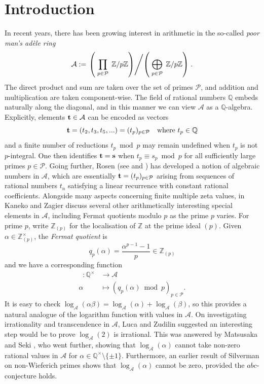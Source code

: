 \documentclass[12pt,reqno]{amsart}
\theoremstyle{remark}
\newcommand{\cA}{\mathcal A}
\newcommand{\cP}{\mathcal P}
\DeclareMathOperator{\logA}{\log_{\mathcal{A}}}
\begin{document}
\section{Introduction}
In recent years, there has been growing interest in arithmetic in the so-called {\it poor man's ad\`{e}le ring}
\[\cA:=\left.\left(\;\prod_{p\in\cP}\;\mathbb{Z}/p\mathbb{Z}\right) \middle/ \left(\;\bigoplus_{p\in\cP}\;\mathbb{Z}/p\mathbb{Z}\right)\right.. \]
The direct product and sum are taken over the set of primes $\cP$, and addition and multiplication are taken component-wise.
The field of rational numbers $\mathbb{Q}$ embeds naturally along the diagonal, and in this manner we can view $\mathcal{A}$ as a $\mathbb{Q}$-algebra. 
Explicitly, elements ${\bf t}\in\cA$ can be encoded as vectors
\[{\bf t}=(t_2, t_3, t_5,...) = (t_p)_{p\in\mathcal{P}}\quad\text{where $t_p\in\mathbb{Q}$}\]
and a finite number of reductions $t_p\bmod p$ may remain undefined when $t_p$ is not $p$-integral. 
One then identifies ${\bf t}={\bf s}$ when $t_p\equiv s_p\bmod p$ for all sufficiently large primes $p\in\cP$. Going further, Rosen (see \cite{Ro20} and \cite{RTTY24}) has developed a notion of algebraic numbers in $\mathcal{A}$, which are essentially ${\bf t}=(t_p)_{p\in\mathcal{P}}$ arising from sequences of rational numbers $t_n$ satisfying a linear recurrence with constant rational coefficients. 
Alongside many aspects concerning finite multiple zeta values, in \cite{KZ} Kaneko and Zagier discuss several other arithmetically interesting special elements in $\cA$, including Fermat quotients modulo $p$ as the prime $p$ varies. 
For prime $p$, write $\mathbb{Z}_{(p)}$ for the localisation of $\mathbb{Z}$ at the prime ideal $(p)$. 
Given $\alpha\in\mathbb{Z}_{(p)}^\times$, the {\it Fermat quotient} is
\[q_p(\alpha)=\frac{\alpha^{p-1}-1}{p}\in\mathbb{Z}_{(p)}\]
and we have a corresponding function
\begin{align*}
\logA:\mathbb{Q}^\times & \longrightarrow\cA \\
\alpha& \longmapsto \left(q_p(\alpha)\bmod p\right)_{p\in\cP}.
\end{align*}
It is easy to check $\log_\cA(\alpha\beta)=\log_\cA(\alpha)+\log_\cA(\beta)$, so this provides a natural analogue of the logarithm function with values in $\cA$. On investigating irrationality and transcendence in $\cA$, Luca and Zudilin \cite{LZ25} suggested an interesting step would be to prove $\log_\cA(2)$ is irrational. This was answered by Matsusaka and Seki \cite{MS26}, who went further, showing that $\log_\cA(\alpha)$ cannot take non-zero rational values in $\cA$ for $\alpha\in\mathbb{Q}^\times\setminus\{\pm 1\}$. Furthermore, an earlier result of Silverman \cite{Si88} on non-Wieferich primes shows that $\log_\cA(\alpha)$ cannot be zero, provided the $abc$-conjecture holds.
\end{document}
